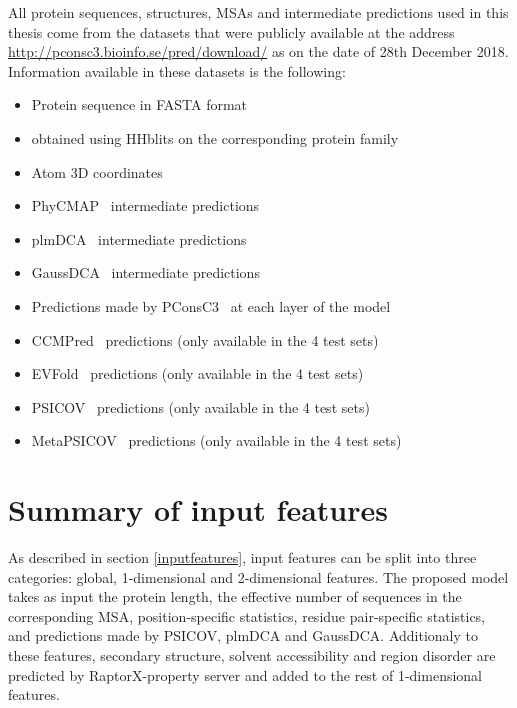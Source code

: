     All protein sequences, structures, MSAs and intermediate predictions used in this thesis come from the datasets that were publicly
    available at the address \url{http://pconsc3.bioinfo.se/pred/download/} as on the date of 28th December 2018.
    Information available in these datasets is the following:


    \begin{itemize}
      \item Protein sequence in FASTA format
      \item {} obtained using HHblits on the corresponding protein family
      \item Atom 3D coordinates
      \item PhyCMAP~\cite{PhyCMap} intermediate predictions
      \item plmDCA~\cite{EKEBERG2014341} intermediate predictions
      \item GaussDCA~\cite{10.1371/journal.pone.0092721} intermediate predictions
      \item Predictions made by PConsC3~\cite{Skwark079673} at each layer of the model
      \item CCMPred~\cite{CCMPred} predictions (only available in the 4 test sets)
      \item EVFold~\cite{Sheridan021022} predictions (only available in the 4 test sets)
      \item PSICOV~\cite{doi:10.1093/bioinformatics/btr638} predictions (only available in the 4 test sets)
      \item MetaPSICOV~\cite{MetaPSICOV} predictions (only available in the 4 test sets)
    \end{itemize}



\section{Summary of input features}

  As described in section \ref{inputfeatures}, input features can be split into three categories:
  global, 1-dimensional and 2-dimensional features.
  The proposed model takes as input the protein length, the effective number of sequences 
  in the corresponding MSA, position-specific statistics,
  residue pair-specific statistics, and predictions made by PSICOV, plmDCA and GaussDCA.
  Additionaly to these features, secondary structure, solvent accessibility and 
  region disorder are predicted by RaptorX-property server and added to the rest of
  1-dimensional features.

